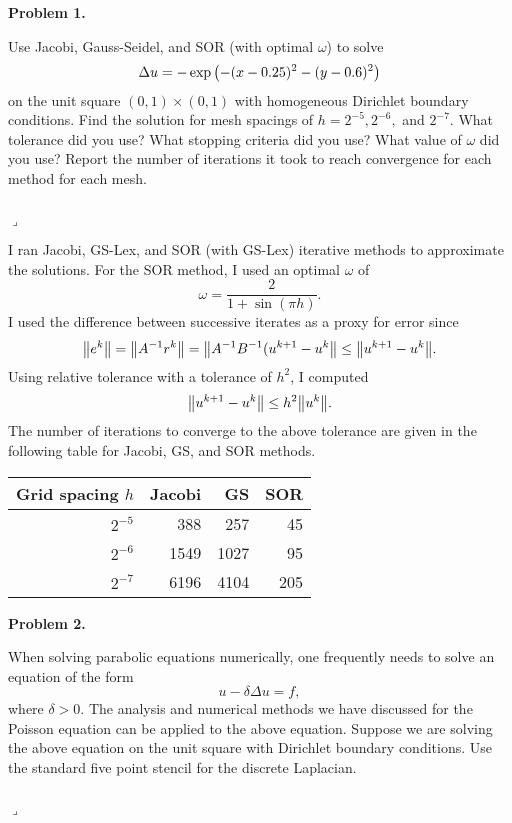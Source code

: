 \documentclass[12pt]{article}
\newenvironment{myprob}[1]
    {%
    \noindent{\Huge$\ulcorner$}\textbf{#1.}\begin{em}
    }
    { 
    \end{em} \\ \hphantom{l} \hfill {\Huge$\lrcorner$} }
\begin{document}
\rhead{\today}

{\let\newpage\relax} 


\begin{myprob}{Problem 1}
Use Jacobi, Gauss-Seidel, and SOR (with optimal $\omega$) to solve
$$\Delta u = -\exp\qty( - (x-0.25)^2 - (y-0.6)^2)$$
on the unit square $(0, 1) \times (0, 1)$ with homogeneous Dirichlet boundary conditions. Find the solution for mesh spacings of $h = 2^{-5}, 2^{-6},$ and $2^{-7}$. What tolerance did you use? What stopping criteria did you use? What value of $\omega$ did you use? Report the number of iterations it took to reach convergence for each method for each mesh.
\end{myprob}

I ran Jacobi, GS-Lex, and SOR (with GS-Lex) iterative methods to approximate the solutions.  For the SOR method, I used an optimal $\omega$ of
$$\omega = \dfrac{2}{1+\sin(\pi h)}.$$
I used the difference between successive iterates as a proxy for error since
$$\norm{e^k} = \norm{A^{-1}r^{k}} = \norm{A^{-1}B^{-1}(u^{k+1}-u^{k}} \leq \norm{u^{k+1} - u^{k}}.$$
Using relative tolerance with a tolerance of $h^2$, I computed 
 $$ \norm{u^{k+1} - u^k} \leq h^2 \norm{u^{k}}.$$
The number of iterations to converge to the above tolerance are given in the following table for Jacobi, GS, and SOR methods.\\
\begin{center}
\begin{tabular}{rrrr}
\hline
   Grid spacing $h$ &   Jacobi &   GS &   SOR \\
\hline
    $2^{-5}$ 	&      388 	&  257 	&    45 \\
    $2^{-6}$	&     1549 	& 1027 	&    95 \\
    $2^{-7}$	&     6196 	& 4104 	&   205 \\
\hline
\end{tabular}
\end{center}

\begin{myprob}{Problem 2}
 When solving parabolic equations numerically, one frequently needs to solve an equation of the form
 $$u - \delta \Delta u = f,$$
 where $\delta > 0$. The analysis and numerical methods we have discussed for the Poisson equation can be applied to the above equation. Suppose we are solving the above equation on the unit square with Dirichlet boundary conditions. Use the standard five point stencil for the discrete Laplacian.
\end{myprob}
\end{document}
